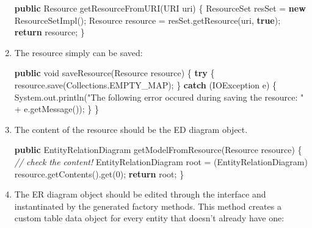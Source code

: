 \documentclass[]{report}
\newenvironment{Shaded}{}{}
\newcommand{\KeywordTok}[1]{\textcolor[rgb]{0.00,0.44,0.13}{\textbf{{#1}}}}
\newcommand{\DataTypeTok}[1]{\textcolor[rgb]{0.56,0.13,0.00}{{#1}}}
\newcommand{\DecValTok}[1]{\textcolor[rgb]{0.25,0.63,0.44}{{#1}}}
\newcommand{\StringTok}[1]{\textcolor[rgb]{0.25,0.44,0.63}{{#1}}}
\newcommand{\CommentTok}[1]{\textcolor[rgb]{0.38,0.63,0.69}{\textit{{#1}}}}
\newcommand{\FunctionTok}[1]{\textcolor[rgb]{0.02,0.16,0.49}{{#1}}}
\newcommand{\NormalTok}[1]{{#1}}
\begin{document}
\begin{enumerate}
\begin{Shaded}
\begin{Highlighting}[]
\KeywordTok{public} \NormalTok{Resource }\FunctionTok{getResourceFromURI}\NormalTok{(URI uri) \{}
   \NormalTok{ResourceSet resSet = }\KeywordTok{new} \FunctionTok{ResourceSetImpl}\NormalTok{();}
   \NormalTok{Resource resource = resSet.}\FunctionTok{getResource}\NormalTok{(uri, }\KeywordTok{true}\NormalTok{);}
   \KeywordTok{return} \NormalTok{resource;}
\NormalTok{\}}
\end{Highlighting}
\end{Shaded}
\item
  The resource simply can be saved:

\begin{Shaded}
\begin{Highlighting}[]
\KeywordTok{public} \DataTypeTok{void} \FunctionTok{saveResource}\NormalTok{(Resource resource) \{}
   \KeywordTok{try} \NormalTok{\{}
     \NormalTok{resource.}\FunctionTok{save}\NormalTok{(Collections.}\FunctionTok{EMPTY_MAP}\NormalTok{);}
   \NormalTok{\} }\KeywordTok{catch} \NormalTok{(IOException e) \{}
      \NormalTok{System.}\FunctionTok{out}\NormalTok{.}\FunctionTok{println}\NormalTok{(}\StringTok{"The following error occured during saving the resource: "}
        \NormalTok{+ e.}\FunctionTok{getMessage}\NormalTok{());}
   \NormalTok{\}}
\NormalTok{\}}
\end{Highlighting}
\end{Shaded}
\item
  The content of the resource should be the ED diagram object.

\begin{Shaded}
\begin{Highlighting}[]
\KeywordTok{public} \NormalTok{EntityRelationDiagram }\FunctionTok{getModelFromResource}\NormalTok{(Resource resource) \{}
   \CommentTok{// check the content!}
   \NormalTok{EntityRelationDiagram root = (EntityRelationDiagram) resource.}\FunctionTok{getContents}\NormalTok{().}\FunctionTok{get}\NormalTok{(}\DecValTok{0}\NormalTok{);}
   \KeywordTok{return} \NormalTok{root;}
\NormalTok{\}}
\end{Highlighting}
\end{Shaded}
\item
  The ER diagram object should be edited through the interface and
  instantinated by the generated factory methods. This method creates a
  custom table data object for every entity that doesn't already have
  one:


\end{enumerate}
\end{document}
